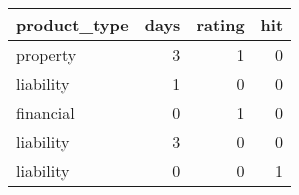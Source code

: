 \begin{tabular}{lrrr}
\toprule
product\_type &  days &  rating &  hit \\
\midrule
    property &     3 &       1 &    0 \\
   liability &     1 &       0 &    0 \\
   financial &     0 &       1 &    0 \\
   liability &     3 &       0 &    0 \\
   liability &     0 &       0 &    1 \\
\bottomrule
\end{tabular}
